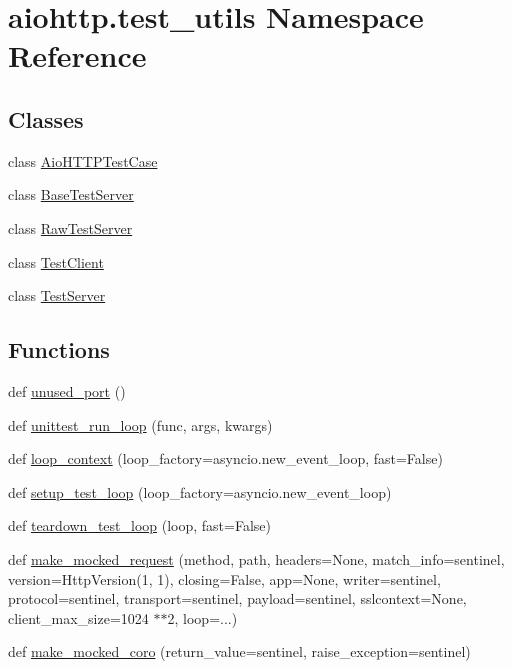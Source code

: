 \hypertarget{namespaceaiohttp_1_1test__utils}{}\section{aiohttp.\+test\+\_\+utils Namespace Reference}
\label{namespaceaiohttp_1_1test__utils}
\subsection*{Classes}
\begin{DoxyCompactItemize}
\item 
class \hyperlink{classaiohttp_1_1test__utils_1_1_aio_h_t_t_p_test_case}{Aio\+H\+T\+T\+P\+Test\+Case}
\item 
class \hyperlink{classaiohttp_1_1test__utils_1_1_base_test_server}{Base\+Test\+Server}
\item 
class \hyperlink{classaiohttp_1_1test__utils_1_1_raw_test_server}{Raw\+Test\+Server}
\item 
class \hyperlink{classaiohttp_1_1test__utils_1_1_test_client}{Test\+Client}
\item 
class \hyperlink{classaiohttp_1_1test__utils_1_1_test_server}{Test\+Server}
\end{DoxyCompactItemize}
\subsection*{Functions}
\begin{DoxyCompactItemize}
\item 
def \hyperlink{namespaceaiohttp_1_1test__utils_a9770c40215cbadb9fa185c34b7fe8935}{unused\+\_\+port} ()
\item 
def \hyperlink{namespaceaiohttp_1_1test__utils_adfdfa4b84d5dfa6d789cef9eb3dc36b7}{unittest\+\_\+run\+\_\+loop} (func, args, kwargs)
\item 
def \hyperlink{namespaceaiohttp_1_1test__utils_ab8e5dd7849cf2738ae5cc90a616e3349}{loop\+\_\+context} (loop\+\_\+factory=asyncio.\+new\+\_\+event\+\_\+loop, fast=False)
\item 
def \hyperlink{namespaceaiohttp_1_1test__utils_a78b60aab76f3be72e95f7cf4d6c84eaa}{setup\+\_\+test\+\_\+loop} (loop\+\_\+factory=asyncio.\+new\+\_\+event\+\_\+loop)
\item 
def \hyperlink{namespaceaiohttp_1_1test__utils_a363c70db902f00b6b6c1e71971a8ed3b}{teardown\+\_\+test\+\_\+loop} (loop, fast=False)
\item 
def \hyperlink{namespaceaiohttp_1_1test__utils_a2ebaf0270b54d8cf8c9ee700d30bdc00}{make\+\_\+mocked\+\_\+request} (method, path, headers=None, match\+\_\+info=sentinel, version=Http\+Version(1, 1), closing=False, app=None, writer=sentinel, protocol=sentinel, transport=sentinel, payload=sentinel, sslcontext=None, client\+\_\+max\+\_\+size=1024 $\ast$$\ast$2, loop=...)
\item 
def \hyperlink{namespaceaiohttp_1_1test__utils_aa94db37a64ab84f56f7190edc72f0f05}{make\+\_\+mocked\+\_\+coro} (return\+\_\+value=sentinel, raise\+\_\+exception=sentinel)
\end{DoxyCompactItemize}


